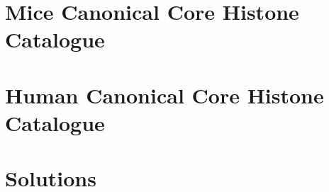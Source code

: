 \appendix

\chapter{Mice Canonical Core Histone Catalogue}
  \label{ch:mice-catalogue}
  \begingroup
  \newcommand{\ResultsDir}{results-mus-musculus}
  \newcommand{\FigsDir}{figs-mus-musculus}
  \newcommand{\ReferenceDir}{data/reference-mus-musculus/}
  \endgroup

\chapter{Human Canonical Core Histone Catalogue}
  \begingroup
  \newcommand{\ResultsDir}{results-homo-sapiens}
  \newcommand{\FigsDir}{figs-homo-sapiens}
  \newcommand{\ReferenceDir}{data/reference-homo-sapiens}
  \endgroup

\chapter{Solutions}
  \label{app:solutions}


